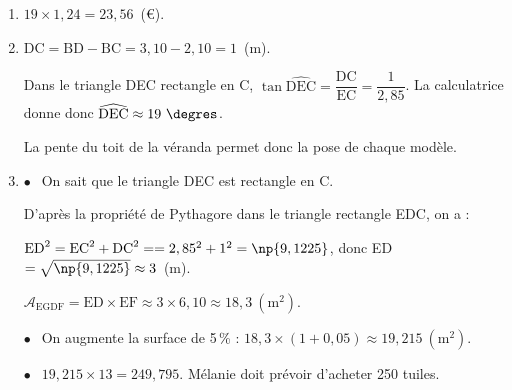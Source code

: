 
\medskip

\begin{enumerate}
\item $19 \times 1,24 = 23,56$~(\euro).
\item $\text{DC} = \text{BD} - \text{BC} = 3,10 - 2,10 = 1$~(m).

Dans le triangle DEC rectangle en C, $\tan \widehat{\text{DEC}} = \dfrac{\text{DC}}{\text{EC}} = \dfrac{1}{2,85}$.  La calculatrice donne donc $\widehat{\text{DEC}} \approx 19~\degres$.

La pente du toit de la véranda permet donc la pose de chaque modèle.

\item $\bullet~~$ On sait que le triangle DEC est rectangle en C.

D'après la propriété de Pythagore dans le triangle rectangle EDC, on a : 

$\text{ED}^2 = \text{EC}^2 + \text{DC}^2 = = 2,85^2 + 1^2 = \np{9,1225}$, 
donc ED $= \sqrt{\np{9,1225}} \approx 3$~(m).

$\mathcal{A}_{\text{EGDF}} = \text{ED} \times \text{EF}\approx  3 \times  6,10 \approx  18,3~\left(\text{m}^2\right)$.

$\bullet~~$ On augmente la surface de 5\,\% : $18,3 \times  (1 + 0,05) \approx 19,215~\left(\text{m}^2\right)$.

$\bullet~~$ $19,215 \times  13 = 249,795$. Mélanie doit prévoir d'acheter 250 tuiles.
\end{enumerate}

\vspace{0,5cm}

